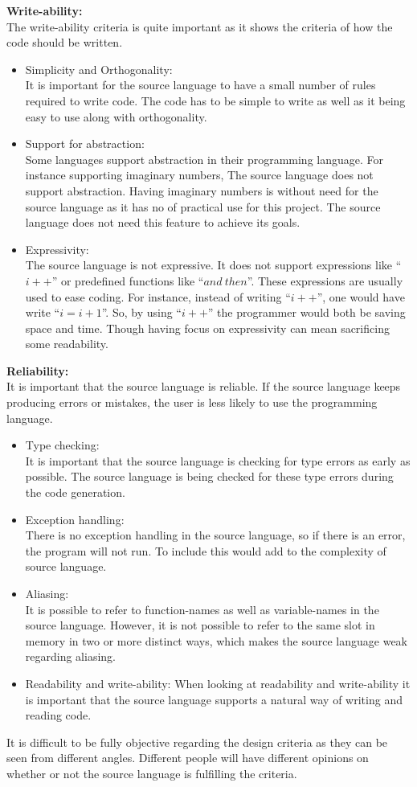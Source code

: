 \textbf{Write-ability:} \\
The write-ability criteria is quite important as it shows the criteria of how the code should be written. 
\begin{itemize}
\item Simplicity and Orthogonality: \\
It is important for the source language to have a small number of rules required to write code. The code has to be simple to write as well as it being easy to use along with orthogonality.
\item Support for abstraction: \\
Some languages support abstraction  in their programming language. For instance supporting imaginary numbers, The source language does not support abstraction. Having imaginary numbers is without need for the source language as it has no of practical use for this project. The source language does not need this feature to achieve its goals.
\item Expressivity: \\
The source language is not expressive. It does not support expressions like ``$i++$'' or predefined functions like ``$and~then$''. These expressions are usually used to ease coding. For instance, instead of writing ``$i++$'', one would have write ``$i = i + 1$''. So, by using ``$i++$'' the programmer would both be saving space and time. Though having focus on expressivity can mean sacrificing some readability. 
\end{itemize}
\textbf{Reliability:} \\
It is important that the source language is reliable. If the source language keeps producing errors or mistakes, the user is less likely to use the programming language.
\begin{itemize}
\item Type checking: \\
It is important that the source language is checking for type errors as early as possible. The source language is being checked for these type errors during the code generation.
\item Exception handling: \\
There is no exception handling in the source language, so if there is an error, the program will not run. To include this would add to the complexity of source language.
\item Aliasing: \\
It is possible to refer to function-names as well as variable-names in the source language. However, it is not possible to refer to the same slot in memory in two or more distinct ways, which makes the source language weak regarding aliasing. 
\item Readability and write-ability:
When looking at readability and write-ability it is important that the source language supports a natural way of writing and reading code. 
\end{itemize}
It is difficult to be fully objective regarding the design criteria as they can be seen from different angles. Different people will have different opinions on whether or not the source language is fulfilling the criteria. 